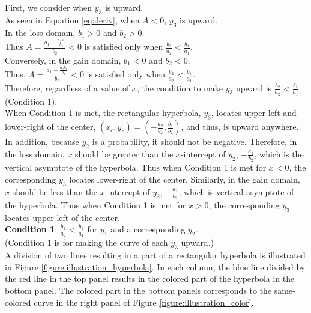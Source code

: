 \documentclass[11pt, a4paper]{article}
\begin{document}
\noindent
First, we consider when $y_3$ is upward.\\ 
As seen in Equation \ref{eq:deriv}, when $A<0$, $y_3$ is upward.\\

\noindent
In the loss domain, $b_1>0$ and $b_2>0$.\\
Thus $A = \frac{a_1-\frac{a_2 b_1}{b_2}}{b_2}<0$ is satisfied only when  $\frac{b_2}{a_2} < \frac{b_1}{a_1}$.\\

\noindent
Conversely, in the gain domain, $b_1<0$ and $b_2<0$.\\
Thus, $A = \frac{a_1-\frac{a_2 b_1}{b_2}}{b_2}<0$ is satisfied only when $\frac{b_2}{a_2} < \frac{b_1}{a_1}$.\\

\noindent
Therefore, regardless of a value of $x$, the condition to make $y_3$ upward is $\frac{b_2}{a_2} < \frac{b_1}{a_1}$  (Condition 1).\\

\noindent
When Condition 1 is met, the rectangular hyperbola, $y_3$, locates upper-left and lower-right of the center, $(x_c, y_c) = (-\frac{a_2}{b_2}, \frac{b_1}{b_2})$, and thus, is upward anywhere.\\

\noindent
In addition, because $y_2$ is a probability, it should not be negative. Therefore, in the loss domain, $x$ should be greater than the $x$-intercept of $y_2$, $-\frac{a_2}{b_2}$, which is the vertical asymptote of the hyperbola. Thus when Condition 1 is met for $x<0$, the corresponding $y_3$ locates lower-right of the center.
Similarly, in the gain domain, $x$ should be less than the $x$-intercept of $y_2$, $-\frac{a_2}{b_2}$, which is vertical asymptote of the hyperbola. Thus when Condition 1 is met for $x>0$, the corresponding $y_3$ locates upper-left of the center.\\ 

\noindent
\textbf{Condition 1}: $\frac{b_2}{a_2} < \frac{b_1}{a_1}$ for $y_1$ and a corresponding $y_2$.\\
(Condition 1 is for making the curve of each $y_3$ upward.)\\

\noindent
A division of two lines resulting in a part of a rectangular hyperbola is illustrated in Figure \ref{figure:illustration_hyperbola}. In each column, the blue line divided by the red line in the top panel results in the colored part of the hyperbola in the bottom panel. The colored part in the bottom panels corresponds to the same-colored curve in the right panel of Figure \ref{figure:illustration_color}.
\end{document}
